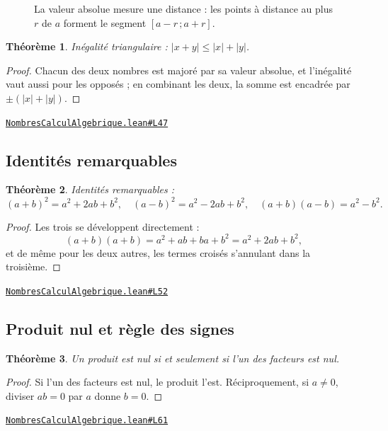 \documentclass[11pt,a4paper]{article}
\theoremstyle{definition}
\theoremstyle{plain}
\newtheorem{theoreme}{Théorème}
\newcommand{\source}[2]{\par\smallskip\noindent\hfill{\footnotesize\href{#1}{\texttt{#2}}}\par\smallskip}
\begin{document}
\begin{figure}[h]
\centering

\caption{La valeur absolue mesure une distance : les points à distance au plus $r$ de $a$ forment le segment $[a - r\,;a + r]$.}
\end{figure}

\begin{theoreme}
Inégalité triangulaire : $|x + y| \le |x| + |y|$.
\end{theoreme}

\begin{proof}
Chacun des deux nombres est majoré par sa valeur absolue, et l'inégalité vaut aussi
pour les opposés ; en combinant les deux, la somme est encadrée par
$\pm(|x| + |y|)$.
\end{proof}
\source{https://github.com/Commutator-IO/learn-lean/blob/main/courses/02-lycee/01-nombres-calcul-algebrique/NombresCalculAlgebrique.lean\#L47}{NombresCalculAlgebrique.lean\#L47}

\subsection{Identités remarquables}

\begin{theoreme}
Identités remarquables :
\[ (a+b)^2 = a^2 + 2ab + b^2, \quad (a-b)^2 = a^2 - 2ab + b^2, \quad
   (a+b)(a-b) = a^2 - b^2 . \]
\end{theoreme}

\begin{proof}
Les trois se développent directement :
\[ (a+b)(a+b) = a^2 + ab + ba + b^2 = a^2 + 2ab + b^2 , \]
et de même pour les deux autres, les termes croisés s'annulant dans la troisième.
\end{proof}
\source{https://github.com/Commutator-IO/learn-lean/blob/main/courses/02-lycee/01-nombres-calcul-algebrique/NombresCalculAlgebrique.lean\#L52}{NombresCalculAlgebrique.lean\#L52}

\subsection{Produit nul et règle des signes}

\begin{theoreme}
Un produit est nul si et seulement si l'un des facteurs est nul.
\end{theoreme}

\begin{proof}
Si l'un des facteurs est nul, le produit l'est. Réciproquement, si $a \ne 0$, diviser
$ab = 0$ par $a$ donne $b = 0$.
\end{proof}
\source{https://github.com/Commutator-IO/learn-lean/blob/main/courses/02-lycee/01-nombres-calcul-algebrique/NombresCalculAlgebrique.lean\#L61}{NombresCalculAlgebrique.lean\#L61}
\end{document}
